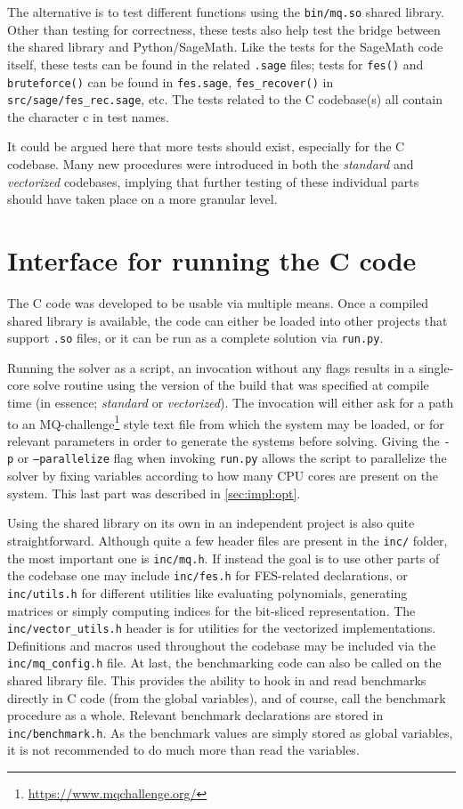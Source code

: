 The alternative is to test different functions using the \texttt{bin/mq.so} shared library. Other than testing for correctness, these tests also help test the bridge between the shared library and Python/SageMath. Like the tests for the SageMath code itself, these tests can be found in the related \texttt{.sage} files; tests for \texttt{fes()} and \texttt{bruteforce()} can be found in \texttt{fes.sage}, \texttt{fes\_recover()} in \texttt{src/sage/fes\_rec.sage}, etc. The tests related to the C codebase(s) all contain the character c in test names.

It could be argued here that more tests should exist, especially for the C codebase. Many new procedures were introduced in both the \textit{standard} and \textit{vectorized} codebases, implying that further testing of these individual parts should have taken place on a more granular level. 

\section{Interface for running the C code} \label{sec:impl:interface}
The C code was developed to be usable via multiple means. Once a compiled shared library is available, the code can either be loaded into other projects that support \texttt{.so} files, or it can be run as a complete solution via \texttt{run.py}. 

Running the solver as a script, an invocation without any flags results in a single-core solve routine using the version of the build that was specified at compile time (in essence; \textit{standard} or \textit{vectorized}). The invocation will either ask for a path to an MQ-challenge\footnote{\url{https://www.mqchallenge.org/}} style text file from which the system may be loaded, or for relevant parameters in order to generate the systems before solving. Giving the \texttt{-p} or \texttt{--parallelize} flag when invoking \texttt{run.py} allows the script to parallelize the solver by fixing variables according to how many CPU cores are present on the system. This last part was described in \cref{sec:impl:opt}.

Using the shared library on its own in an independent project is also quite straightforward. Although quite a few header files are present in the \texttt{inc/} folder, the most important one is \texttt{inc/mq.h}. If instead the goal is to use other parts of the codebase one may include \texttt{inc/fes.h} for FES-related declarations, or \texttt{inc/utils.h} for different utilities like evaluating polynomials, generating matrices or simply computing indices for the bit-sliced representation. The \texttt{inc/vector\_utils.h} header is for utilities for the vectorized implementations. Definitions and macros used throughout the codebase may be included via the \texttt{inc/mq\_config.h} file. At last, the benchmarking code can also be called on the shared library file. This provides the ability to hook in and read benchmarks directly in C code (from the global variables), and of course, call the benchmark procedure as a whole. Relevant benchmark declarations are stored in \texttt{inc/benchmark.h}. As the benchmark values are simply stored as global variables, it is not recommended to do much more than read the variables. 

